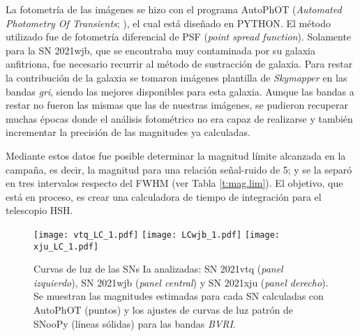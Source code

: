 \documentclass[baaa]{baaa}
\begin{document}
La fotometría de las imágenes se hizo con el programa {\sc AutoPhOT} ({\em Automated Photometry Of Transients}; \citealp[]{Autophot}), el cual está diseñado en {\sc PYTHON}. El método utilizado fue de fotometría diferencial de PSF ({\em point spread function}). Solamente para la SN 2021wjb, que se encontraba muy contaminada por su galaxia anfitriona, fue necesario recurrir al método de sustracción de galaxia. Para restar la contribución de la galaxia se tomaron imágenes plantilla de {\em Skymapper} \citep{Skymapper...36...33O} en las bandas \textit{gri}, siendo las mejores disponibles para esta galaxia. Aunque las bandas a restar no fueron las mismas que las de nuestras imágenes, se pudieron recuperar muchas épocas donde el análisis fotométrico no era capaz de realizarse y también incrementar la precisión de las magnitudes ya calculadas.

Mediante estos datos fue posible determinar la magnitud límite alcanzada en la campaña, es decir, la magnitud para una relación señal-ruido de 5; y se la separó en tres intervalos respecto del FWHM (ver Tabla \ref{t:mag.lim}). El objetivo, que está en proceso, es crear una calculadora de tiempo de integración para el telescopio HSH. 

\begin{figure*}[t]
 \centering
   \label{f:vtq}
    \texttt{[image: vtq\_LC\_1.pdf]}
   \label{f:wjb}
    \texttt{[image: LCwjb\_1.pdf]}
       \label{f:wjb}
    \texttt{[image: xju\_LC\_1.pdf]}
 \caption{Curvas de luz de las SNs Ia analizadas: SN 2021vtq ({\em panel izquierdo}), SN 2021wjb ({\em panel central}) y SN 2021xju ({\em panel derecho}). Se muestran las magnitudes estimadas para cada SN calculadas con {\sc AutoPhOT} (puntos) y los ajustes de curvas de luz patrón de {\sc SNooPy} (líneas sólidas) para las bandas \textit{BVRI}.}
 \label{f:LC.SNs}
\end{figure*}
\end{document}
